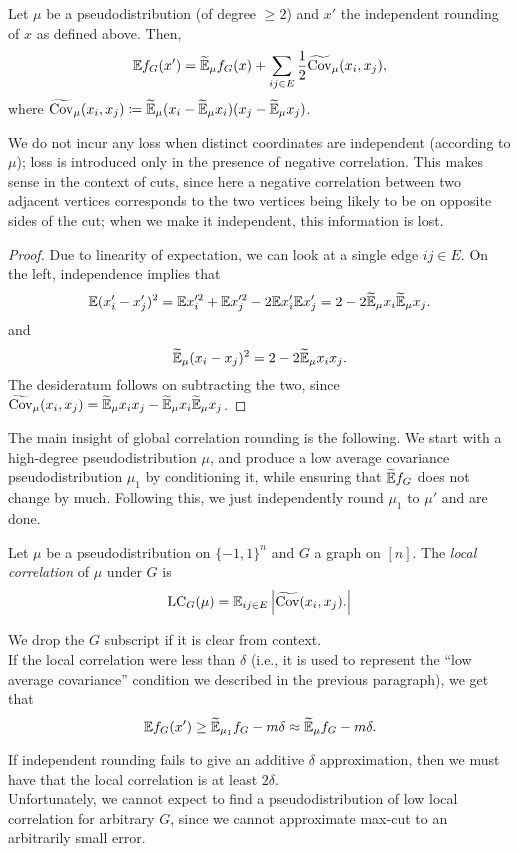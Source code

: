 	\begin{fprop}
		Let $\mu$ be a pseudodistribution (of degree $\ge 2$) and $x'$ the independent rounding of $x$ as defined above. Then,
		\[ \mathbb{E} f_G(x') = \widetilde{\mathbb{E}}_\mu f_G(x) + \sum_{ij \in E} \frac{1}{2} \widetilde{\operatorname{Cov}}_\mu(x_i,x_j), \]
		where $\widetilde{\operatorname{Cov}}_\mu (x_i,x_j) \coloneqq \widetilde{\mathbb{E}}_\mu (x_i - \widetilde{\mathbb{E}}_\mu x_i)(x_j - \widetilde{\mathbb{E}}_\mu x_j)$.
	\end{fprop}
	We do not incur any loss when distinct coordinates are independent (according to $\mu$); loss is introduced only in the presence of negative correlation. This makes sense in the context of cuts, since here a negative correlation between two adjacent vertices corresponds to the two vertices being likely to be on opposite sides of the cut; when we make it independent, this information is lost.
	\begin{proof}
		Due to linearity of expectation, we can look at a single edge $ij \in E$. On the left, independence implies that
		\[ \mathbb{E} (x_i' - x_j')^2 = \mathbb{E} x_i'^2 + \mathbb{E} x_j'^2 - 2 \mathbb{E} x_i' \mathbb{E} x_j' = 2 - 2 \widetilde{\mathbb{E}}_\mu x_i \widetilde{\mathbb{E}}_\mu x_j. \]
		and
		\[ \widetilde{\mathbb{E}}_\mu (x_i - x_j)^2 = 2 - 2\widetilde{\mathbb{E}}_\mu x_i x_j. \]
		The desideratum follows on subtracting the two, since $\widetilde{\operatorname{Cov}}_\mu(x_i,x_j) = \widetilde{\mathbb{E}}_\mu x_i x_j - \widetilde{\mathbb{E}}_\mu x_i \widetilde{\mathbb{E}}_\mu x_j$.
	\end{proof}

	The main insight of global correlation rounding is the following. We start with a high-degree pseudodistribution $\mu$, and produce a low average covariance pseudodistribution $\mu_1$ by conditioning it, while ensuring that $\widetilde{\mathbb{E}} f_G$ does not change by much. Following this, we just independently round $\mu_1$ to $\mu'$ and are done.\\

	\begin{fdef}
		Let $\mu$ be a pseudodistribution on $\{-1,1\}^n$ and $G$ a graph on $[n]$. The \emph{local correlation} of $\mu$ under $G$ is
		\[ \operatorname{LC}_G(\mu) = \mathbb{E}_{ij \in E} \left|\widetilde{\operatorname{Cov}}(x_i,x_j).\right| \]
	\end{fdef}
	We drop the $G$ subscript if it is clear from context.\\
	If the local correlation were less than $\delta$ (i.e., it is used to represent the ``low average covariance'' condition we described in the previous paragraph), we get that
	\[ \mathbb{E} f_G(x') \ge \widetilde{\mathbb{E}}_{\mu_1} f_G - m\delta \approx \widetilde{\mathbb{E}}_\mu f_G - m\delta. \]

	If independent rounding fails to give an additive $\delta$ approximation, then we must have that the local correlation is at least $2\delta$.\\
	Unfortunately, we cannot expect to find a pseudodistribution of low local correlation for arbitrary $G$, since we cannot approximate max-cut to an arbitrarily small error.\\ %

